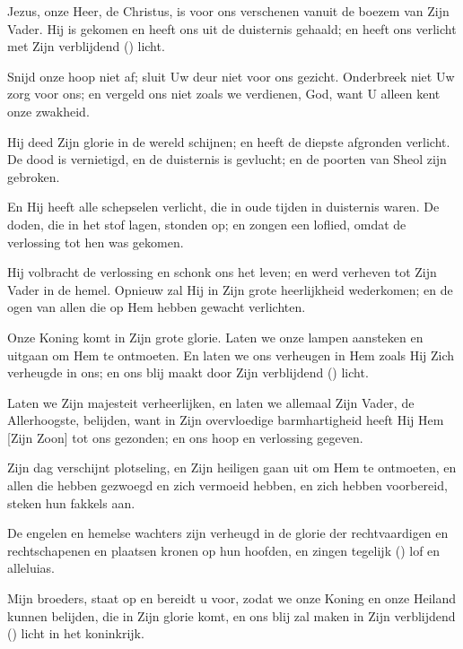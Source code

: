 \documentclass[12pt,twoside,a5paper]{article}
\begin{document}
\begin{halfparskip}
   Jezus, onze Heer, de Christus, is voor ons verschenen vanuit de boezem van Zijn Vader. Hij is gekomen en heeft ons uit de duisternis gehaald; en heeft ons verlicht met Zijn verblijdend () licht.

   Snijd onze hoop niet af; sluit Uw deur niet voor ons gezicht. Onderbreek niet Uw zorg voor ons; en vergeld ons niet zoals we verdienen, God, want U alleen kent onze zwakheid.

   Hij deed Zijn glorie in de wereld schijnen; en heeft de diepste afgronden verlicht. De dood is vernietigd, en de duisternis is gevlucht; en de poorten van Sheol zijn gebroken.

   En Hij heeft alle schepselen verlicht, die in oude tijden in duisternis waren. De doden, die in het stof lagen, stonden op; en zongen een loflied, omdat de verlossing tot hen was gekomen.

   Hij volbracht de verlossing en schonk ons het leven; en werd verheven tot Zijn Vader in de hemel. Opnieuw zal Hij in Zijn grote heerlijkheid wederkomen; en de ogen van allen die op Hem hebben gewacht verlichten.

   Onze Koning komt in Zijn grote glorie. Laten we onze lampen aansteken en uitgaan om Hem te ontmoeten. En laten we ons verheugen in Hem zoals Hij Zich verheugde in ons; en ons blij maakt door Zijn verblijdend () licht.

   Laten we Zijn majesteit verheerlijken, en laten we allemaal Zijn Vader, de Allerhoogste, belijden, want in Zijn overvloedige barmhartigheid heeft Hij Hem [Zijn Zoon] tot ons gezonden; en ons hoop en verlossing gegeven.

   Zijn dag verschijnt plotseling, en Zijn heiligen gaan uit om Hem te ontmoeten, en allen die hebben gezwoegd en zich vermoeid hebben, en zich hebben voorbereid, steken hun fakkels aan.

   De engelen en hemelse wachters zijn verheugd in de glorie der rechtvaardigen en rechtschapenen en plaatsen kronen op hun hoofden, en zingen tegelijk () lof en alleluias.

   Mijn broeders, staat op en bereidt u voor, zodat we onze Koning en onze Heiland kunnen belijden, die in Zijn glorie komt, en ons blij zal maken in Zijn verblijdend () licht in het koninkrijk.
\end{halfparskip}
\end{document}
